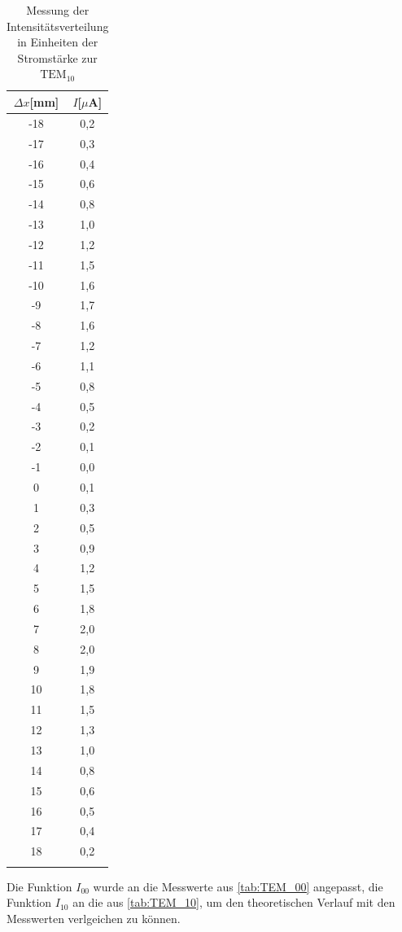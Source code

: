 \begin{table}
\centering
\caption{Messung der Intensitätsverteilung in Einheiten der Stromstärke zur $\text{TEM}_{10}$}
\begin{tabular}{c c}
\toprule
{$\Delta x$[mm]} & {$I$[$\mu$A]}\\
\midrule
-18	&	0,2	\\
-17	&	0,3	\\
-16	&	0,4	\\
-15	&	0,6	\\
-14	&	0,8	\\
-13	&	1,0	\\
-12	&	1,2	\\
-11	&	1,5	\\
-10	&	1,6	\\
-9	&	1,7	\\
-8	&	1,6	\\
-7	&	1,2	\\
-6	&	1,1	\\
-5	&	0,8	\\
-4	&	0,5	\\
-3	&	0,2	\\
-2	&	0,1	\\
-1	&	0,0	\\
0	&	0,1	\\
1	&	0,3	\\
2	&	0,5	\\
3	&	0,9	\\
4	&	1,2	\\
5	&	1,5	\\
6	&	1,8	\\
7	&	2,0	\\
8	&	2,0	\\
9	&	1,9	\\
10	&	1,8	\\
11	&	1,5	\\
12	&	1,3	\\
13	&	1,0	\\
14	&	0,8	\\
15	&	0,6	\\
16	&	0,5	\\
17	&	0,4	\\
18	&	0,2	\\
\bottomrule
\label{tab:TEM_10}
\end{tabular}
\end{table}


\clearpage

Die Funktion $I_{00}$ wurde an die Messwerte aus \autoref{tab:TEM_00} angepasst, die Funktion $I_{10}$ an die aus \autoref{tab:TEM_10}, um den theoretischen Verlauf mit den Messwerten verlgeichen zu können.

